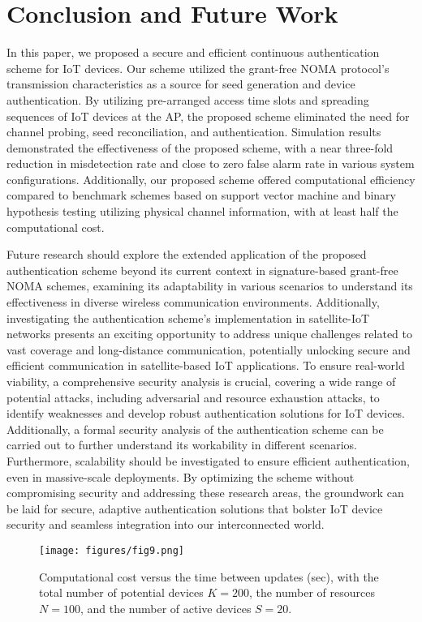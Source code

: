 \documentclass[journal,10pt]{IEEEtran}
\begin{document}
\section{Conclusion and Future Work}
In this paper, we proposed a secure and efficient continuous authentication scheme for IoT devices. Our scheme utilized the grant-free NOMA protocol's transmission characteristics as a source for seed generation and device authentication. By utilizing pre-arranged access time slots and spreading sequences of IoT devices at the AP, the proposed scheme eliminated the need for channel probing, seed reconciliation, and authentication. Simulation results demonstrated the effectiveness of the proposed scheme, with a near three-fold reduction in misdetection rate and close to zero false alarm rate in various system configurations. Additionally, our proposed scheme offered computational efficiency compared to benchmark schemes based on support vector machine and binary hypothesis testing utilizing physical channel information, with at least half the computational cost. 

Future research should explore the extended application of the proposed authentication scheme beyond its current context in signature-based grant-free NOMA schemes, examining its adaptability in various scenarios to understand its effectiveness in diverse wireless communication environments. Additionally, investigating the authentication scheme's implementation in satellite-IoT networks presents an exciting opportunity to address unique challenges related to vast coverage and long-distance communication, potentially unlocking secure and efficient communication in satellite-based IoT applications. To ensure real-world viability, a comprehensive security analysis is crucial, covering a wide range of potential attacks, including adversarial and resource exhaustion attacks, to identify weaknesses and develop robust authentication solutions for IoT devices. Additionally, a formal security analysis of the authentication scheme can be carried out to further understand its workability in different scenarios. Furthermore, scalability should be investigated to ensure efficient authentication, even in massive-scale deployments. By optimizing the scheme without compromising security and addressing these research areas, the groundwork can be laid for secure, adaptive authentication solutions that bolster IoT device security and seamless integration into our interconnected world. 

\begin{figure}[t] 
\centering
\texttt{[image: figures/fig9.png]}
\caption{Computational cost versus the time between updates (sec), with the total number of potential devices $K = 200$, the number of resources $N = 100$, and the number of active devices $S = 20$.}
\label{ComputeCost}
\end{figure}


\balance


\end{document}
